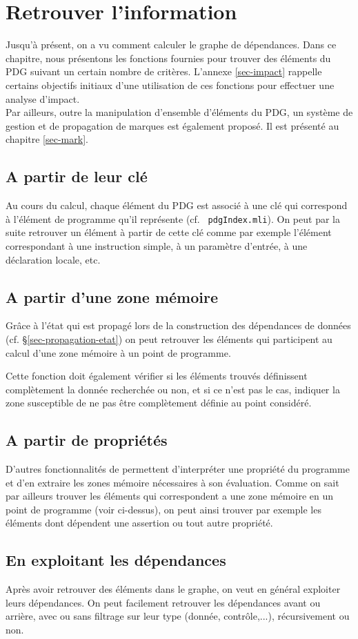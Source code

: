 \chapter{Retrouver l'information}\label{sec-find}

Jusqu'à présent, on a vu comment calculer le graphe de dépendances.
Dans ce chapitre, nous présentons les fonctions fournies pour
trouver des éléments du PDG suivant un certain nombre de critères.
L'annexe \ref{sec-impact} rappelle certains objectifs initiaux
d'une utilisation de ces fonctions pour effectuer une analyse d'impact.\\

Par ailleurs, outre la manipulation d'ensemble d'éléments du PDG,
un système de gestion et de propagation de marques est également proposé.
Il est présenté au chapitre \ref{sec-mark}.

\section{A partir de leur clé}

Au cours du calcul, chaque élément du PDG est associé à une clé
qui correspond à l'élément de programme qu'il représente (cf. {\tt
pdgIndex.mli}).
On peut par la suite retrouver un élément à partir de cette clé
comme par exemple l'élément correspondant à une instruction simple,
à un paramètre d'entrée, à une déclaration locale, etc.

\section{A partir d'une zone mémoire}

Grâce à l'état qui est propagé lors de la construction
des dépendances de données (cf. \S\ref{sec-propagation-etat})
on peut retrouver les éléments qui participent au calcul
d'une zone mémoire à un point de programme.

Cette fonction doit également vérifier si les éléments trouvés
définissent complètement la donnée recherchée ou non,
et si ce n'est pas le cas, indiquer la zone susceptible de ne pas être
complètement définie au point considéré.

\section{A partir de propriétés}

D'autres fonctionnalités de \ppc permettent d'interpréter une propriété
du programme et d'en extraire les zones mémoire nécessaires à son évaluation.
Comme on sait par ailleurs trouver les éléments qui correspondent
a une zone mémoire en un point de programme (voir ci-dessus),
on peut ainsi trouver par exemple les éléments dont dépendent une assertion
ou tout autre propriété.

\section{En exploitant les dépendances}

Après avoir retrouver des éléments dans le graphe, on veut en général exploiter
leurs dépendances. On peut facilement retrouver les dépendances avant ou
arrière,
avec ou sans filtrage sur leur type (donnée, contrôle,...),
récursivement ou non.
